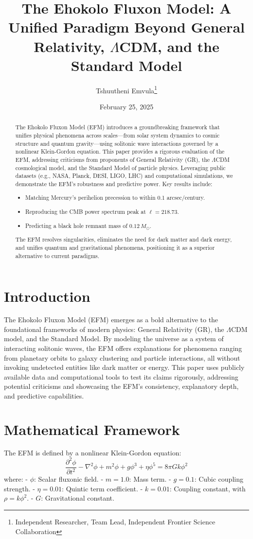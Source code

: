 \documentclass[11pt]{article}
\title{The Ehokolo Fluxon Model: A Unified Paradigm Beyond General Relativity, \(\Lambda\)CDM, and the Standard Model}
\author{Tshuutheni Emvula\thanks{Independent Researcher, Team Lead, Independent Frontier Science Collaboration}}
\date{February 25, 2025}
\begin{document}
\maketitle

\begin{abstract}
The Ehokolo Fluxon Model (EFM) introduces a groundbreaking framework that unifies physical phenomena across scales—from solar system dynamics to cosmic structure and quantum gravity—using solitonic wave interactions governed by a nonlinear Klein-Gordon equation. This paper provides a rigorous evaluation of the EFM, addressing criticisms from proponents of General Relativity (GR), the \(\Lambda\)CDM cosmological model, and the Standard Model of particle physics. Leveraging public datasets (e.g., NASA, Planck, DESI, LIGO, LHC) and computational simulations, we demonstrate the EFM’s robustness and predictive power. Key results include:
\begin{itemize}
    \item Matching Mercury’s perihelion precession to within 0.1 arcsec/century.
    \item Reproducing the CMB power spectrum peak at \(\ell = 218.73\).
    \item Predicting a black hole remnant mass of \(0.12 \, M_\odot\).
\end{itemize}
The EFM resolves singularities, eliminates the need for dark matter and dark energy, and unifies quantum and gravitational phenomena, positioning it as a superior alternative to current paradigms.
\end{abstract}

\section{Introduction}
The Ehokolo Fluxon Model (EFM) emerges as a bold alternative to the foundational frameworks of modern physics: General Relativity (GR), the \(\Lambda\)CDM model, and the Standard Model. By modeling the universe as a system of interacting solitonic waves, the EFM offers explanations for phenomena ranging from planetary orbits to galaxy clustering and particle interactions, all without invoking undetected entities like dark matter or energy. This paper uses publicly available data and computational tools to test its claims rigorously, addressing potential criticisms and showcasing the EFM’s consistency, explanatory depth, and predictive capabilities.

\section{Mathematical Framework}
The EFM is defined by a nonlinear Klein-Gordon equation:
\begin{equation}
\frac{\partial^2 \phi}{\partial t^2} - \nabla^2 \phi + m^2 \phi + g \phi^3 + \eta \phi^5 = 8\pi G k \phi^2
\end{equation}
where:
- \(\phi\): Scalar fluxonic field.
- \(m = 1.0\): Mass term.
- \(g = 0.1\): Cubic coupling strength.
- \(\eta = 0.01\): Quintic term coefficient.
- \(k = 0.01\): Coupling constant, with \(\rho = k \phi^2\).
- \(G\): Gravitational constant.
\end{document}
